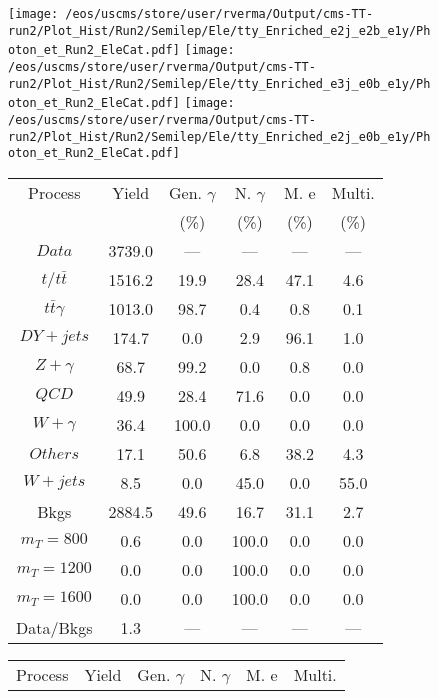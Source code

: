 \begin{figure}
\centering
\texttt{[image: /eos/uscms/store/user/rverma/Output/cms-TT-run2/Plot\_Hist/Run2/Semilep/Ele/tty\_Enriched\_e2j\_e2b\_e1y/Photon\_et\_Run2\_EleCat.pdf]}
\texttt{[image: /eos/uscms/store/user/rverma/Output/cms-TT-run2/Plot\_Hist/Run2/Semilep/Ele/tty\_Enriched\_e3j\_e0b\_e1y/Photon\_et\_Run2\_EleCat.pdf]}
\texttt{[image: /eos/uscms/store/user/rverma/Output/cms-TT-run2/Plot\_Hist/Run2/Semilep/Ele/tty\_Enriched\_e2j\_e0b\_e1y/Photon\_et\_Run2\_EleCat.pdf]}
\begin{minipage}[c]{0.32\textwidth}
\centering
\tiny{
\begin{tabular}{cccccc}
\hline
Process & Yield & Gen. $\gamma$ & N. $\gamma$ & M. e & Multi. \\
 &  & (\%) & (\%) & (\%) & (\%)  \\
\hline
                                                                      $ Data $ &  3739.0 &  --- &  --- &  --- &  ---\\
$ t/t\bar{t} $ &  1516.2 &  19.9 &  28.4 &  47.1 &  4.6\\
$ t\bar{t}\gamma $ &  1013.0 &  98.7 &  0.4 &  0.8 &  0.1\\
$ DY+jets $ &  174.7 &  0.0 &  2.9 &  96.1 &  1.0\\
$ Z+\gamma $ &  68.7 &  99.2 &  0.0 &  0.8 &  0.0\\
$ QCD $ &  49.9 &  28.4 &  71.6 &  0.0 &  0.0\\
$ W+\gamma $ &  36.4 &  100.0 &  0.0 &  0.0 &  0.0\\
$ Others $ &  17.1 &  50.6 &  6.8 &  38.2 &  4.3\\
$ W+jets $ &  8.5 &  0.0 &  45.0 &  0.0 &  55.0\\
Bkgs &  2884.5 &  49.6 &  16.7 &  31.1 &  2.7\\
$ m_{T} = 800 $ &  0.6 &  0.0 &  100.0 &  0.0 &  0.0\\
$ m_{T} = 1200 $ &  0.0 &  0.0 &  100.0 &  0.0 &  0.0\\
$ m_{T} = 1600 $ &  0.0 &  0.0 &  100.0 &  0.0 &  0.0\\
Data/Bkgs &  1.3 &  --- &  --- &  --- &  ---\\
\hline
\end{tabular}
}
\end{minipage}
\begin{minipage}[c]{0.32\textwidth}
\centering
\tiny{
\begin{tabular}{cccccc}
\hline
Process & Yield & Gen. $\gamma$ & N. $\gamma$ & M. e & Multi. \\

\end{tabular}}
\end{minipage}
\end{figure}
